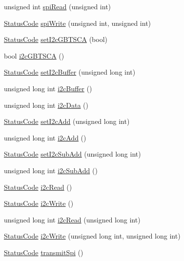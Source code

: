 \begin{DoxyCompactItemize}
\item 
unsigned int \hyperlink{classSeqPGA_a654a40dc597227e59458631f49ff598f}{spi\+Read} (unsigned int)
\item 
\hyperlink{classStatusCode}{Status\+Code} \hyperlink{classSeqPGA_a3cc382925053df4b2fc7d3a99b4def20}{spi\+Write} (unsigned int, unsigned int)
\item 
\hyperlink{classStatusCode}{Status\+Code} \hyperlink{classSeqPGA_aef7911620b07d8aeef2a9ec95fa58ca4}{set\+I2c\+G\+B\+T\+S\+CA} (bool)
\item 
bool \hyperlink{classSeqPGA_a1d9edf6e3303581efe0bdb1b8b3fff0c}{i2c\+G\+B\+T\+S\+CA} ()
\item 
\hyperlink{classStatusCode}{Status\+Code} \hyperlink{classSeqPGA_ab93beca49a31c1f9fddc915e9efeeaa0}{set\+I2c\+Buffer} (unsigned long int)
\item 
unsigned long int \hyperlink{classSeqPGA_a3d441522bfe5a6d35b8a77cbcd38b49e}{i2c\+Buffer} ()
\item 
unsigned long int \hyperlink{classSeqPGA_a5e48f7b7ca1ada5a1decc0436dda4b26}{i2c\+Data} ()
\item 
\hyperlink{classStatusCode}{Status\+Code} \hyperlink{classSeqPGA_a4ef334e4d2cb417b49033dce951728cd}{set\+I2c\+Add} (unsigned long int)
\item 
unsigned long int \hyperlink{classSeqPGA_a67022684977cb2f6335eb6b21262fe89}{i2c\+Add} ()
\item 
\hyperlink{classStatusCode}{Status\+Code} \hyperlink{classSeqPGA_a348c5d982223fb5cf2878e5bf3c6429c}{set\+I2c\+Sub\+Add} (unsigned long int)
\item 
unsigned long int \hyperlink{classSeqPGA_a6c7137f9b45a20ecfcccf1d47e5af985}{i2c\+Sub\+Add} ()
\item 
\hyperlink{classStatusCode}{Status\+Code} \hyperlink{classSeqPGA_a7cd344df2be99f3a02b487f80e87b27e}{i2c\+Read} ()
\item 
\hyperlink{classStatusCode}{Status\+Code} \hyperlink{classSeqPGA_a429076ca3a4ece94182bd95c623bb9d0}{i2c\+Write} ()
\item 
unsigned long int \hyperlink{classSeqPGA_a9cf54d57d77b04f54cc0fe516c3528b4}{i2c\+Read} (unsigned long int)
\item 
\hyperlink{classStatusCode}{Status\+Code} \hyperlink{classSeqPGA_a4176b2047888421f8766d038e35bccfd}{i2c\+Write} (unsigned long int, unsigned long int)
\item 
\hyperlink{classStatusCode}{Status\+Code} \hyperlink{classSeqPGA_a579b4ab222e1c4778640948fbf2a8805}{transmit\+Spi} ()
\end{DoxyCompactItemize}
